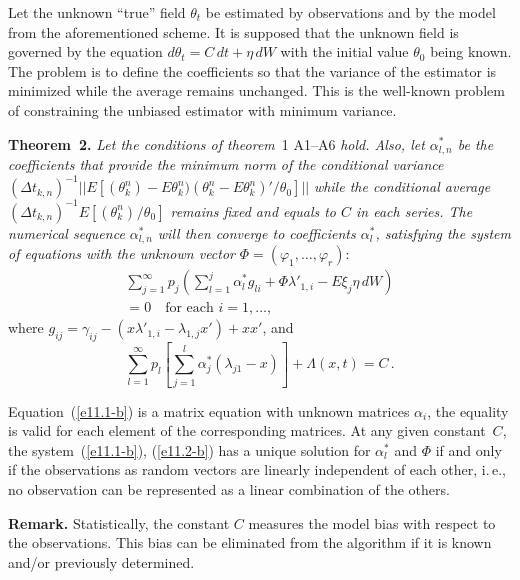 \begin{multicols}{2}
Let the unknown ``true'' field $\theta_{t} $ be estimated by observations and 
by the model from the aforementioned scheme. It is supposed that the unknown field 
is governed by the equation $d\theta_{t} =C\,dt+\eta\,dW$ with the initial value 
$\theta_{0} $ being known. The problem is to define the coefficients so that the variance 
of the estimator is minimized while the average remains unchanged. This is the 
well-known problem of constraining the unbiased estimator with minimum variance.

\smallskip

\noindent 
\textbf{Theorem~2.}
\textit{Let the conditions of theorem}~1 A1--A6 \textit{hold. Also, let $\alpha ^{*}_{l,n} $ be 
the coefficients that provide the minimum norm of the conditional variance}
$
(\Delta t_{k,n} )^{-1} ||E[(\theta_{k}^{n} )-E\theta_{k}^{n} )
(\theta_{k}^{n} -E\theta_{k}^{n} )'/\theta_{0} ]||
$ 
\textit{while the conditional average 
$(\Delta t_{k,n} )^{-1} E[(\theta_{k}^{n} )^{} /\theta_{0} ]$ remains fixed and equals 
to $C$ in each series. The numerical sequence $\alpha ^{*}_{l,n} $
will then converge to coefficients $\alpha ^{*}_{l} $, satisfying the system 
of equations with the unknown vector} $\Phi=(\varphi_{1} ,\ldots ,\varphi_{r})$:
\begin{multline}
\sum\limits_{j=1}^{\infty }p_{j}  \left(\sum\limits_{l=1}^{j}\alpha_{l}^{*} 
g_{li} +\Phi \lambda '_{1,i} -E \xi_{j} \eta\, dW \right)\\
=0 \quad \mbox{for \ each \ } 
i=1, \dots  ,
\label{e11.1-b} 
\end{multline}
where
$g_{ij} =\gamma_{ij} -(x\lambda '_{1,i} -\lambda_{1,j} x')+xx'$, and
\begin{equation}
\sum\limits_{l=1}^{\infty }p_{l}  \left[\sum\limits_{j=1}^{l}\alpha_{j}^{*}  (\lambda_{j1} -x)\right]+
\Lambda (x,t)=C \,. 
\label{e11.2-b} 
\end{equation}

Equation~(\ref{e11.1-b}) is a matrix equation with unknown matrices $\alpha_{i} $, 
the equality is valid for each element of the corresponding matrices. At any  given 
constant~$C$, the system~(\ref{e11.1-b}), (\ref{e11.2-b}) 
has a unique solution for $\alpha ^{*}_{l} $ and 
$\Phi$ if and only if the observations as random vectors are linearly independent 
of each other, i.\,e., no observation can be represented as a linear combination of the others.

\smallskip

\noindent
\textbf{Remark.} Statistically, the constant $C$ measures the model bias with respect to 
the observations. This bias can be eliminated from the algorithm if it is known and/or 
previously determined.


\end{multicols}
